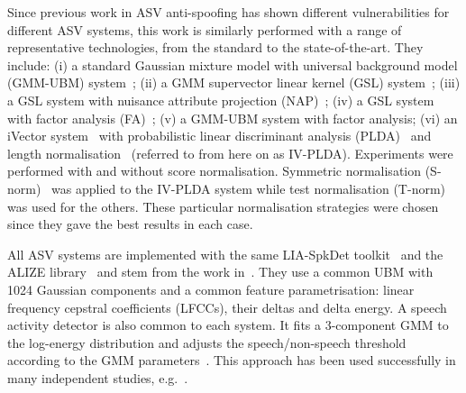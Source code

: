 
Since previous work in ASV anti-spoofing has shown different vulnerabilities for different ASV systems, this work is similarly performed with a range of representative technologies, from the standard to the state-of-the-art.
They include: 
(i) a standard Gaussian mixture model with universal background model (GMM-UBM) system~\cite{Reynolds2000};
(ii) a GMM supervector linear kernel (GSL) system~\cite{Campbell2006b};
(iii) a GSL system with nuisance attribute projection (NAP)~\cite{Campbell2006};
(iv) a GSL system with factor analysis (FA)~\cite{Fauve2007};
(v) a GMM-UBM system with factor analysis;
(vi) an iVector system~\cite{Dehak2011} with probabilistic linear discriminant analysis (PLDA)~\cite{Li2012} and length normalisation~\cite{Garcia2011} (referred to from here on as IV-PLDA). 
Experiments were performed with and without score normalisation.  
Symmetric normalisation (S-norm)~\cite{Kenny2010} was applied to the IV-PLDA system while test normalisation (T-norm)~\cite{Auckenthaler2000} was used for the others.  These particular normalisation strategies were chosen since they gave the best results in each case. 

All ASV systems are implemented with the same LIA-SpkDet toolkit~\cite{Bonastre2008} and the ALIZE library~\cite{Bonastre2004} and stem from the work in~\cite{Fauve2007}.
They use a common UBM with 1024 Gaussian components and a common feature parametrisation: linear frequency cepstral coefficients (LFCCs), their deltas and delta energy. 
A speech activity detector is also common to each system.  
It fits a 3-component GMM to the log-energy distribution and adjusts the speech/non-speech threshold according to the GMM parameters~\cite{Bimbot2004}.
This approach has been used successfully in many independent studies, e.g.~\cite{fauve2008}. 

